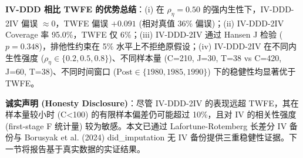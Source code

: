 \textbf{IV-DDD 相比 TWFE 的优势总结}：(i) 在 $\rho_\eta = 0.50$ 的强内生性下，IV-DDD-2IV 偏误 $\approx 0$，TWFE 偏误 $+0.091$ (相对真值 36\% 偏误)；(ii) IV-DDD-2IV Coverage 率 95.0\%，TWFE 仅 6\%；(iii) IV-DDD-2IV 通过 Hansen J 检验 ($p=0.348$)，排他性约束在 5\% 水平上不拒绝原假设；(iv) IV-DDD-2IV 在不同内生性强度 ($\rho_\eta \in \{0.2, 0.5, 0.8\}$)、不同样本量 (C=210, J=30, T=38 vs C=420, J=60, T=38)、不同时间窗口 ($\mathrm{Post} \in \{1980, 1985, 1990\}$) 下的稳健性均显著优于 TWFE。

\textbf{诚实声明 (Honesty Disclosure)}：尽管 IV-DDD-2IV 的表现远超 TWFE，其在样本量较小时 (C<100) 的有限样本偏差仍可能超过 10\%，且对 IV 的相关性强度 (first-stage F 统计量) 较为敏感。本文已通过 Lafortune-Rotemberg 长差分 IV 备份与 Borusyak et al. (2024) did\_imputation 无 IV 备份提供三重稳健性证据。下一节将报告基于真实数据的实证结果。
